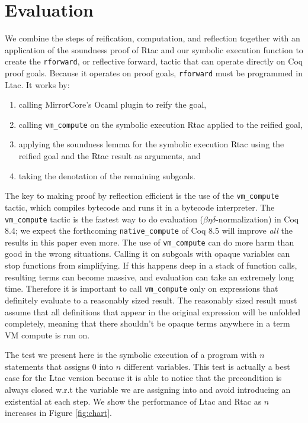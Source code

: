 \documentclass{puthesis}
\begin{document}
\chapter{Evaluation}

We combine the steps of reification, computation, and reflection
together with an application of the soundness proof of Rtac and our
symbolic execution function to create the \lstinline|rforward|, or
reflective forward, tactic that can operate directly on Coq proof
goals. Because it operates on proof goals, \lstinline|rforward| must
be programmed in Ltac.  It works by:
\begin{enumerate}
\item calling MirrorCore's Ocaml plugin to reify the goal,
\item calling \lstinline|vm_compute| on the symbolic execution Rtac
  applied to the reified goal,
\item applying the soundness lemma for the symbolic execution Rtac
  using the reified goal and the Rtac result as arguments, and
\item taking the denotation of the remaining subgoals.
\end{enumerate}
The key to making proof by reflection efficient is the use of the
\lstinline|vm_compute| tactic, which compiles bytecode and runs it in
a bytecode interpreter. The \lstinline|vm_compute| tactic is the
fastest way to do evaluation ($\beta\eta\delta$-normalization) in Coq
8.4; we expect the forthcoming \lstinline{native_compute} of Coq 8.5
will improve \emph{all} the results in this paper even more.  The use
of \lstinline|vm_compute| can do more harm than good in the wrong
situations. Calling it on subgoals with opaque variables can stop
functions from simplifying. If this happens deep in a stack of
function calls, resulting terms can become massive, and evaluation can
take an extremely long time. Therefore it is important to call
\lstinline|vm_compute| only on expressions that definitely evaluate to
a reasonably sized result. The reasonably sized result must assume
that all definitions that appear in the original expression will be
unfolded completely, meaning that there shouldn't be opaque terms
anywhere in a term VM compute is run on.

  
The test we present here is the symbolic execution of a program with
$n$ statements that assigns $0$ into $n$ different variables. This
test is actually a best case for the Ltac version because it is able
to notice that the precondition is always closed w.r.t the variable we
are assigning into and avoid introducing an existential at each
step. 
We show the performance of Ltac and
Rtac as $n$ increases in Figure \ref{fig:chart}.
\end{document}
